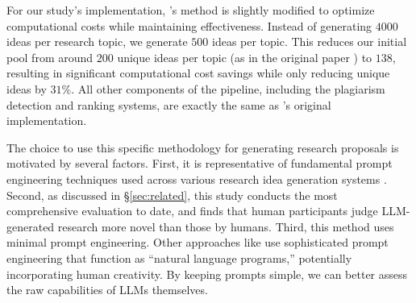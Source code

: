 For our study's implementation, \citet{si2024can}'s method is slightly modified to optimize computational costs while maintaining effectiveness. 
Instead of generating $4000$ ideas per research topic, 
we generate $500$ ideas per topic. 
This reduces our initial pool from around $200$ unique ideas per topic (as in the original paper \citep{si2024can}) 
to $138$, 
resulting in significant computational cost savings 
while only reducing unique ideas by $31\%$. 
All other components of the pipeline, 
including the plagiarism detection and ranking systems, 
are exactly the same as \citet{si2024can}'s original implementation.

The choice to use this specific methodology \citep{si2024can}
 for generating research proposals is motivated by several factors. 
 First, it is representative of fundamental prompt engineering techniques 
used across various research idea generation systems \citep{li2024chain, lu2024ai, baek2024researchagent, li2024mlr, wang2023scimon, yang2023large, weng2024cycleresearcher}. 
Second, as discussed in \S\ref{sec:related}, 
this study conducts the most comprehensive evaluation to date, 
and finds that human participants judge LLM-generated research 
more 
novel than those 
by humans. 
Third, this method uses minimal prompt engineering. Other approaches like \citet{li2024chain} use sophisticated prompt engineering that function as ``natural language programs,'' potentially incorporating human creativity. By keeping prompts simple, we can better assess the raw capabilities of LLMs themselves.
